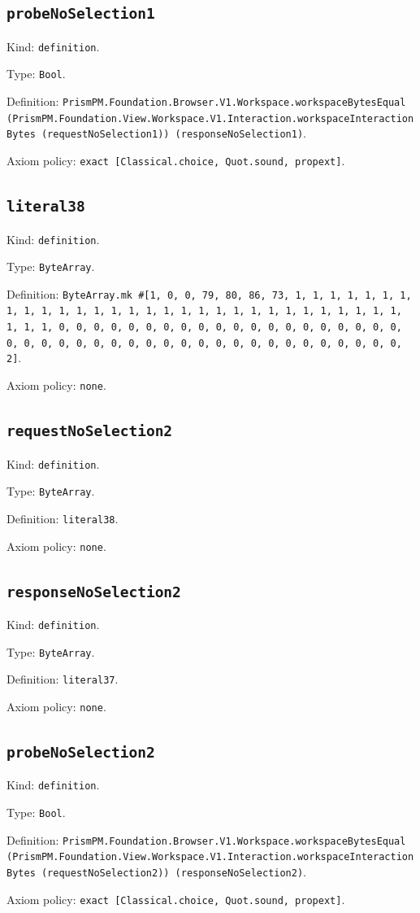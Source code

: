 \documentclass[11pt]{article}
\begin{document}
\subsection*{\texttt{probeNoSelection1}}
\noindent Kind: \texttt{definition}.\par
\noindent Type: \texttt{Bool}.\par
\noindent Definition: \texttt{PrismPM.Foundation.Browser.V1.Workspace.workspaceBytesEqual (PrismPM.Foundation.View.Workspace.V1.Interaction.workspaceInteractionBytes (requestNoSelection1)) (responseNoSelection1)}.\par
\noindent Axiom policy: \texttt{exact [Classical.choice, Quot.sound, propext]}.\par
\subsection*{\texttt{literal38}}
\noindent Kind: \texttt{definition}.\par
\noindent Type: \texttt{ByteArray}.\par
\noindent Definition: \texttt{ByteArray.mk \#[1, 0, 0, 79, 80, 86, 73, 1, 1, 1, 1, 1, 1, 1, 1, 1, 1, 1, 1, 1, 1, 1, 1, 1, 1, 1, 1, 1, 1, 1, 1, 1, 1, 1, 1, 1, 1, 1, 1, 1, 0, 0, 0, 0, 0, 0, 0, 0, 0, 0, 0, 0, 0, 0, 0, 0, 0, 0, 0, 0, 0, 0, 0, 0, 0, 0, 0, 0, 0, 0, 0, 0, 0, 0, 0, 0, 0, 0, 0, 0, 0, 0, 0, 2]}.\par
\noindent Axiom policy: \texttt{none}.\par
\subsection*{\texttt{requestNoSelection2}}
\noindent Kind: \texttt{definition}.\par
\noindent Type: \texttt{ByteArray}.\par
\noindent Definition: \texttt{literal38}.\par
\noindent Axiom policy: \texttt{none}.\par
\subsection*{\texttt{responseNoSelection2}}
\noindent Kind: \texttt{definition}.\par
\noindent Type: \texttt{ByteArray}.\par
\noindent Definition: \texttt{literal37}.\par
\noindent Axiom policy: \texttt{none}.\par
\subsection*{\texttt{probeNoSelection2}}
\noindent Kind: \texttt{definition}.\par
\noindent Type: \texttt{Bool}.\par
\noindent Definition: \texttt{PrismPM.Foundation.Browser.V1.Workspace.workspaceBytesEqual (PrismPM.Foundation.View.Workspace.V1.Interaction.workspaceInteractionBytes (requestNoSelection2)) (responseNoSelection2)}.\par
\noindent Axiom policy: \texttt{exact [Classical.choice, Quot.sound, propext]}.\par
\end{document}
